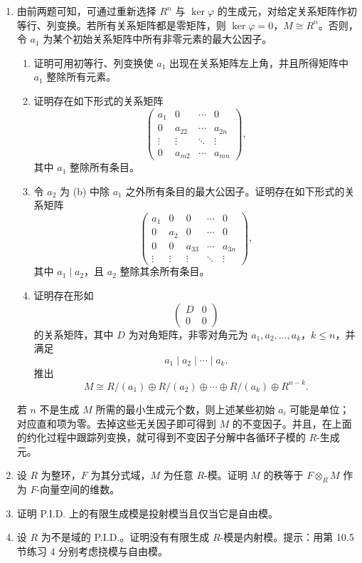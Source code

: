 \begin{enumerate}[label=\arabic*.]
\item 由前两题可知，可通过重新选择 $R^n$ 与 $\ker\varphi$ 的生成元，对给定关系矩阵作初等行、列变换。若所有关系矩阵都是零矩阵，则 $\ker\varphi=0$，$M\cong R^n$。否则，令 $a_1$ 为某个初始关系矩阵中所有非零元素的最大公因子。
\begin{enumerate}[label=(\alph*)]
\item 证明可用初等行、列变换使 $a_1$ 出现在关系矩阵左上角，并且所得矩阵中 $a_1$ 整除所有元素。
\item 证明存在如下形式的关系矩阵
\[
\begin{pmatrix}
 a_1&0&\cdots&0\\
 0&a_{22}&\cdots&a_{2n}\\
 \vdots&\vdots&\ddots&\vdots\\
 0&a_{m2}&\cdots&a_{mn}
\end{pmatrix},
\]
其中 $a_1$ 整除所有条目。
\item 令 $a_2$ 为 (b) 中除 $a_1$ 之外所有条目的最大公因子。证明存在如下形式的关系矩阵
\[
\begin{pmatrix}
 a_1&0&0&\cdots&0\\
 0&a_2&0&\cdots&0\\
 0&0&a_{33}&\cdots&a_{3n}\\
 \vdots&\vdots&\vdots&\ddots&\vdots
\end{pmatrix},
\]
其中 $a_1\mid a_2$，且 $a_2$ 整除其余所有条目。
\item 证明存在形如
\[
\begin{pmatrix}
D&0\\
0&0
\end{pmatrix}
\]
的关系矩阵，其中 $D$ 为对角矩阵，非零对角元为 $a_1,a_2,\ldots,a_k$，$k\leq n$，并满足
\[
a_1\mid a_2\mid\cdots\mid a_k.
\]
推出
\[
M\cong R/(a_1)\oplus R/(a_2)\oplus\cdots\oplus R/(a_k)\oplus R^{n-k}.
\]
\end{enumerate}

若 $n$ 不是生成 $M$ 所需的最小生成元个数，则上述某些初始 $a_i$ 可能是单位；对应直和项为零。去掉这些无关因子即可得到 $M$ 的不变因子。并且，在上面的约化过程中跟踪列变换，就可得到不变因子分解中各循环子模的 $R$-生成元。

\item 设 $R$ 为整环，$F$ 为其分式域，$M$ 为任意 $R$-模。证明 $M$ 的秩等于 $F\otimes_R M$ 作为 $F$-向量空间的维数。

\item 证明 P.I.D. 上的有限生成模是投射模当且仅当它是自由模。

\item 设 $R$ 为不是域的 P.I.D.。证明没有有限生成 $R$-模是内射模。提示：用第 10.5 节练习 4 分别考虑挠模与自由模。
\end{enumerate}



